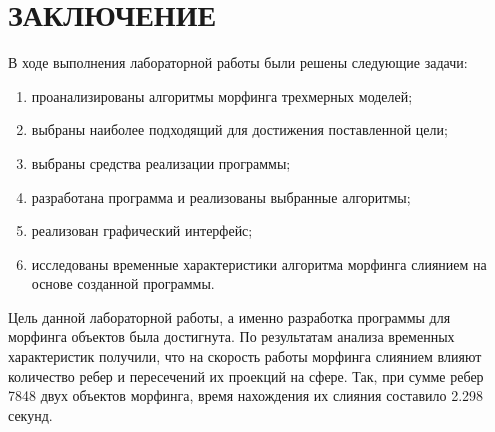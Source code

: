 \chapter*{ЗАКЛЮЧЕНИЕ}

В ходе выполнения лабораторной работы были решены следующие задачи:

\begin{enumerate}[label={\arabic*)}]
\item проанализированы алгоритмы морфинга трехмерных моделей;
\item выбраны наиболее подходящий для достижения поставленной цели;
\item выбраны средства реализации программы;
\item разработана программа и реализованы выбранные алгоритмы;
\item реализован графический интерфейс;
\item исследованы временные характеристики алгоритма морфинга слиянием на основе созданной программы.
\end{enumerate}

Цель данной лабораторной работы, а именно разработка программы для морфинга объектов была достигнута. По результатам анализа временных характеристик получили, что на скорость работы морфинга слиянием влияют количество ребер и пересечений их проекций на сфере. Так, при сумме ребер 7848 двух объектов морфинга, время нахождения их слияния составило 2.298 секунд.